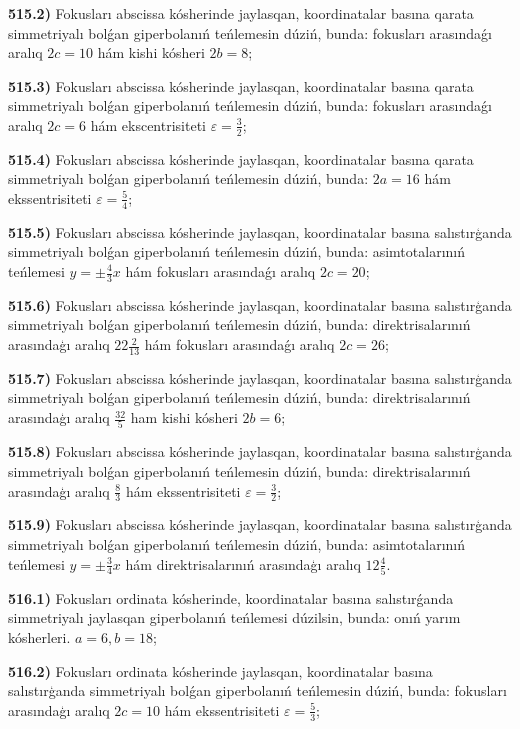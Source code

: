 \textbf{515.2)} Fokusları abscissa kósherinde jaylasqan, koordinatalar basına qarata simmetriyalı bolǵan giperbolanıń teńlemesin dúziń, bunda: fokusları arasındaǵı aralıq $2 c=10$ hám kishi kósheri $2 b=8$;

\textbf{515.3)} Fokusları abscissa kósherinde jaylasqan, koordinatalar basına qarata simmetriyalı bolǵan giperbolanıń teńlemesin dúziń, bunda: fokusları arasındaǵı aralıq $2 c=6$ hám ekscentrisiteti $\varepsilon=\frac{3}{2}$;

\textbf{515.4)}  Fokusları abscissa kósherinde jaylasqan, koordinatalar basına qarata simmetriyalı bolǵan giperbolanıń teńlemesin dúziń, bunda: $2 a=16$ hám ekssentrisiteti $\varepsilon=\frac{5}{4}$;

\textbf{515.5)} Fokusları abscissa kósherinde jaylasqan, koordinatalar basına salıstırģanda simmetriyalı bolǵan giperbolanıń teńlemesin dúziń, bunda: asimtotalarınıń teńlemesi $y= \pm \frac{4}{3} x$ hám fokusları arasındaǵı aralıq $2 c=20$;

\textbf{515.6)} Fokusları abscissa kósherinde jaylasqan, koordinatalar basına salıstırģanda simmetriyalı bolǵan giperbolanıń teńlemesin dúziń, bunda: direktrisalarınıń arasındaģı aralıq $22 \frac{2}{13}$ hám fokusları arasındaǵı aralıq $2 c=26$;

\textbf{515.7)} Fokusları abscissa kósherinde jaylasqan, koordinatalar basına salıstırģanda simmetriyalı bolǵan giperbolanıń teńlemesin dúziń, bunda: direktrisalarınıń arasındaģı aralıq $\frac{32}{5}$ ham kishi kósheri $2 b=6$;

\textbf{515.8)} Fokusları abscissa kósherinde jaylasqan, koordinatalar basına salıstırģanda simmetriyalı bolǵan giperbolanıń teńlemesin dúziń, bunda: direktrisalarınıń arasındaģı aralıq $\frac{8}{3}$ hám ekssentrisiteti $\varepsilon=\frac{3}{2}$;

\textbf{515.9)} Fokusları abscissa kósherinde jaylasqan, koordinatalar basına salıstırģanda simmetriyalı bolǵan giperbolanıń teńlemesin dúziń, bunda: asimtotalarınıń teńlemesi $y= \pm \frac{3}{4} x$ hám direktrisalarınıń arasındaģı aralıq $12 \frac{4}{5}$.

\textbf{516.1)} Fokusları ordinata kósherinde, koordinatalar basına salıstırǵanda simmetriyalı jaylasqan giperbolanıń teńlemesi dúzilsin, bunda: onıń yarım kósherleri. $a=6, b=18$;

\textbf{516.2)} Fokusları ordinata kósherinde jaylasqan, koordinatalar basına salıstırģanda simmetriyalı bolǵan giperbolanıń teńlemesin dúziń, bunda: fokusları arasındaģı aralıq $2 c=10$ hám ekssentrisiteti $\varepsilon=\frac{5}{3}$;

